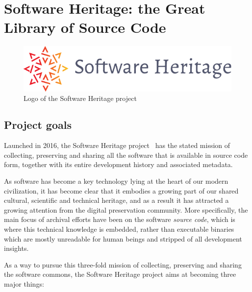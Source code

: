 \chapter{Software Heritage: the Great Library of Source Code}

\begin{figure}
    \centering
    \includegraphics[width=0.5\linewidth]{../img/SWH-logo}
    \caption{Logo of the Software Heritage project}
\end{figure}

\section{Project goals}

Launched in 2016, the Software Heritage project~\cite{swhcacm2018} has the
stated mission of collecting, preserving and sharing all the software that is
available in source code form, together with its entire development history and
associated metadata.

As software has become a key technology lying at the heart of our modern
civilization, it has become clear that it embodies a growing part of our shared
cultural, scientific and technical heritage, and as a result it has attracted
a growing attention from the digital preservation community.
More specifically, the main focus of archival efforts have been on the software
\emph{source code}, which is where this technical knowledge is embedded, rather
than executable binaries which are mostly unreadable for human beings and
stripped of all development insights.

As a way to pursue this three-fold mission of collecting, preserving and
sharing the software commons, the Software Heritage project aims at becoming
three major things:

